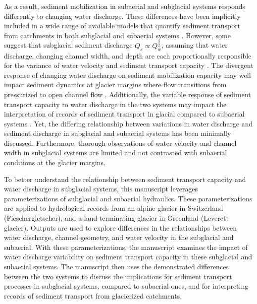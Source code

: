 \documentclass[11pt]{article}
\begin{document}
As a result, sediment mobilization in subaerial and subglacial systems responds differently to changing water discharge.
These differences have been implicitly included in a wide range of available models that  quantify sediment transport from catchments in both subglacial and subaerial systems  \citep[e.g.][]{walder1994,tucker1997,creyts2013,wickert2019,hewitt2019}.
However, some suggest that subglacial sediment discharge  $Q_s \propto Q_w^{\frac{9}{2}}$, assuming that water discharge, changing channel width, and depth are each proportionally responsible for the variance of water velocity and sediment transport capacity \citep{alley1997,swift2021}.
The divergent response of changing water discharge on sediment mobilization capacity may well impact sediment dynamics at glacier margins where flow transitions from pressurized to open channel flow \citep[e.g.][]{lane2016,perolo2018}.
Additionally, the variable response of sediment transport capacity to water discharge in the two systems may impact the interpretation of records of sediment transport in glacial compared to subaerial systems \citep[e.g.][]{muller1968,richards2003,ganti2016}.
Yet, the differing relationship between variations in water discharge and sediment discharge in subglacial and subaerial systems has been minimally discussed.
Furthermore, thorough observations of water velocity and channel width in subglacial systems are limited and not contrasted with subaerial conditions at the glacier margins. 

To better understand the relationship between sediment transport capacity and water discharge in subglacial systems, this manuscript leverages parameterizations of subglacial and subaerial hydraulics.
These parameterizations are applied to hydrological records from an alpine glacier in Switzerland (Fieschergletscher), and  a land-terminating glacier in Greenland (Leverett glacier).
Outputs are used to explore differences in the relationships between  water discharge, channel geometry, and water velocity in the subglacial and subaerial. 
With these parameterizations, the manuscript examines the impact of water discharge variability on sediment transport capacity in these subglacial and subaerial systems.
The manuscript then uses the demonstrated differences between the two systems to discuss the implications for sediment transport processes in subglacial systems, compared to subaerial ones, and for interpreting records of sediment transport from glacierized catchments.
\end{document}
